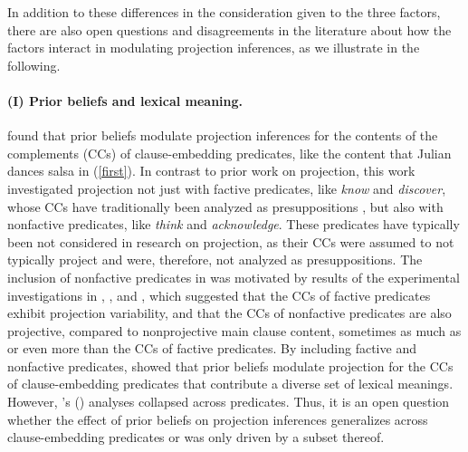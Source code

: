 \documentclass[11pt,fleqn]{article}
\newcommand{\6}{\mbox{$[\hspace*{-.6mm}[$}}
\newcommand{\9}{\mbox{$]\hspace*{-.6mm}]$}}
\newcommand{\citetpos}[1]{\citeauthor{#1}'s (\citeyear{#1})}
\begin{document}
In addition to these differences in the consideration given to the three factors, there are also open questions and disagreements in the literature about how the factors interact in modulating projection inferences, as we illustrate in the following.

\paragraph{(I) Prior beliefs and lexical meaning.} \cite{degen-tonhauser-openmind} found that prior beliefs modulate projection inferences for the contents of the complements (CCs) of clause-embedding predicates, like the content that Julian dances salsa in (\ref{first}). In contrast to prior work on projection, this work investigated projection not just with factive predicates, like {\em know} and {\em discover}, whose CCs have traditionally been analyzed as presuppositions \citep[starting with][]{kiparsky-kiparsky70,karttunen71b}, but also with nonfactive predicates, like {\em think} and {\em acknowledge}. These predicates have typically been not considered in research on projection, as their CCs were assumed to not typically project and were, therefore, not analyzed as presuppositions.  The inclusion of nonfactive predicates in \cite{degen-tonhauser-openmind} was motivated by results of the experimental investigations in \cite{demarneffe-etal-sub23}, \cite{tbd-variability}, and \cite{degen-tonhauser-language}, which suggested that the CCs of factive predicates exhibit projection variability, and that the CCs of nonfactive predicates are also projective, compared to nonprojective main clause content, sometimes as much as or even more than the CCs of factive predicates. By including factive and nonfactive predicates, \cite{degen-tonhauser-openmind} showed that prior beliefs modulate projection for the CCs of clause-embedding predicates that contribute a diverse set of lexical meanings. However, \citetpos{degen-tonhauser-openmind} analyses collapsed across predicates. Thus, it is an open question whether the effect of prior beliefs on projection inferences generalizes across clause-embedding predicates or was only driven by a subset thereof. 
\end{document}
